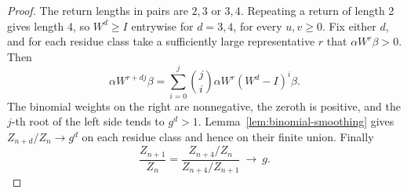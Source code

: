 \begin{proof}
The return lengths in pairs are \(2,3\) or \(3,4\). Repeating a
return of length 2 gives length 4, so \(W^d\ge I\) entrywise for
\(d=3,4\), for every \(u,v\ge0\).
Fix either \(d\), and for each residue class take a sufficiently large
representative \(r\) that \(\alpha W^r\beta>0\). Then
\[
 \alpha W^{r+dj}\beta
   =\sum_{i=0}^j\binom ji\alpha W^r(W^d-I)^i\beta .
\]
The binomial weights on the right are nonnegative, the zeroth is
positive, and the \(j\)-th root of the left side tends to \(g^d>1\).
Lemma~\ref{lem:binomial-smoothing} gives
\(Z_{n+d}/Z_n\to g^d\) on each residue class and hence on their
finite union. Finally
\[
      \frac{Z_{n+1}}{Z_n}
        =\frac{Z_{n+4}/Z_n}{Z_{n+4}/Z_{n+1}}\ \longrightarrow\ g .
\]
\end{proof}
